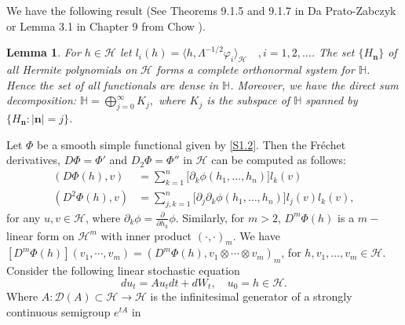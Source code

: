 \documentclass[]{interact}
\theoremstyle{plain}%
\newtheorem{lemma}[theorem]{Lemma}
\theoremstyle{definition}
\theoremstyle{remark}
\begin{document}
        We have the following result (See Theorems 9.1.5 and 9.1.7 in Da
    Prato-Zabczyk \cite{da-za} or Lemma 3.1 in Chapter 9 from Chow \cite{liu}).

    \begin{lemma}\label{s1.le1}
            For 
        $ h \in \mathcal{H} $ let 
        $
            l_i(h)
                =\langle 
                    h, \Lambda^{-1/2}\varphi_i
                 \rangle_\mathcal{H}
            \quad, i=1,2,\ldots
        $. The set $\{H_{\bm{n}}\}$ of all
        Hermite polynomials on $\mathcal{H} $ forms a complete orthonormal 
        system for $\mathbb{H} $. Hence the set of all functionals are dense in
        $\mathbb{H}$. Moreover, we have the direct sum decomposition:
        $
            \mathbb{H} = \bigoplus_{j=0}^\infty K_j,
        $
        where $K_j$ is the subspace of $\mathbb{H} $ spanned by 
        $\{H_{\bm{n}}: |\bm{n}|=j\}$.
    \end{lemma}
%
    Let $\Phi$ be a smooth simple functional given by \eqref{S1.2}. 
    Then the Fr\'echet derivatives, $D \Phi = \Phi'$ and 
    $D_2 \Phi = \Phi''$ in $\mathcal{H}$ can be computed as follows:
    \begin{equation}
        \label{s1.3}
        \begin{aligned}
            (D \Phi(h), v)
            &=
                \sum_{k=1}^n \big[\partial_k \phi(h_1,\ldots,h_n)\big]
                l_k(v)\nonumber
            \\
            (D^2 \Phi(h), v)
            &=
                \sum_{j,k=1}^n \big[\partial_j\partial_k
                \phi(h_1,\ldots,h_n)\big] l_j(v) l_k(v),
        \end{aligned}
    \end{equation}
    for any $u, v \in \mathcal{H}$, where
    $\partial_k \phi= \frac{\partial}{\partial h_k} \phi$.
    Similarly, for $m > 2$, $D^m \Phi(h)$ is a $m-$linear form on
    $\mathcal{H}^m$
    with inner product $(\cdot,\cdot)_m$.
    We have
    $
        [D^m\Phi(h) ](v_1 , \cdots, v_m )
            = (D^m \Phi(h), v_1 \otimes \cdots \otimes v_m )_m
    $,
    for $h, v_1 , \ldots , v_m \in \mathcal{H}$.
    Consider the following linear stochastic equation
    \begin{equation}
        \label{OU}
        du_t=Au_tdt+dW_t, \quad 
        u_0=h\in \mathcal{H}.
    \end{equation}
    Where $A: \mathcal{D}(A) \subset \mathcal{H} \rightarrow \mathcal{H}$ is the
    infinitesimal generator of a strongly continuous semigroup $e^{tA}$ in
\end{document}
